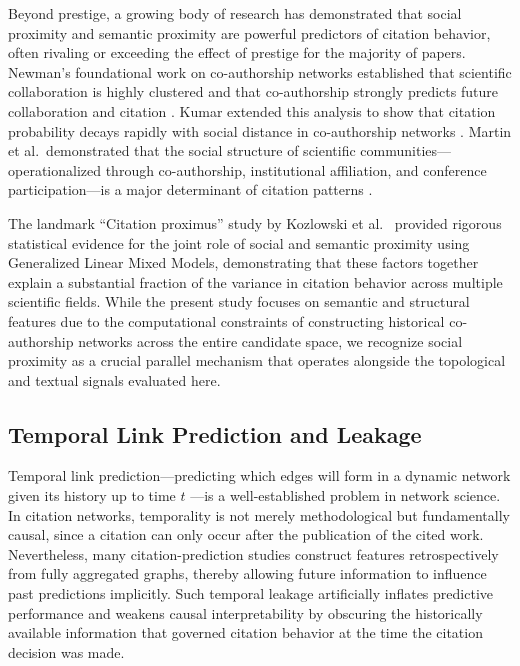 \documentclass[11pt,a4paper]{article}
\begin{document}
Beyond prestige, a growing body of research has demonstrated that social proximity and semantic proximity are powerful predictors of citation behavior, often rivaling or exceeding the effect of prestige for the majority of papers. Newman's foundational work on co-authorship networks established that scientific collaboration is highly clustered and that co-authorship strongly predicts future collaboration and citation \citep{newman2004coauthorship}. Kumar extended this analysis to show that citation probability decays rapidly with social distance in co-authorship networks \citep{kumar2015co}. Martin et al.\ demonstrated that the social structure of scientific communities---operationalized through co-authorship, institutional affiliation, and conference participation---is a major determinant of citation patterns \citep{martin2013coauthorship}.

The landmark ``Citation proximus'' study by Kozlowski et al.\ \citep{kozlowski2025citation} provided rigorous statistical evidence for the joint role of social and semantic proximity using Generalized Linear Mixed Models, demonstrating that these factors together explain a substantial fraction of the variance in citation behavior across multiple scientific fields. While the present study focuses on semantic and structural features due to the computational constraints of constructing historical co-authorship networks across the entire candidate space, we recognize social proximity as a crucial parallel mechanism that operates alongside the topological and textual signals evaluated here.

\subsection{Temporal Link Prediction and Leakage}

Temporal link prediction---predicting which edges will form in a dynamic network given its history up to time \(t\) \citep{liben2007link}---is a well-established problem in network science. In citation networks, temporality is not merely methodological but fundamentally causal, since a citation can only occur after the publication of the cited work. Nevertheless, many citation-prediction studies construct features retrospectively from fully aggregated graphs, thereby allowing future information to influence past predictions implicitly. Such temporal leakage artificially inflates predictive performance and weakens causal interpretability by obscuring the historically available information that governed citation behavior at the time the citation decision was made.
\end{document}

